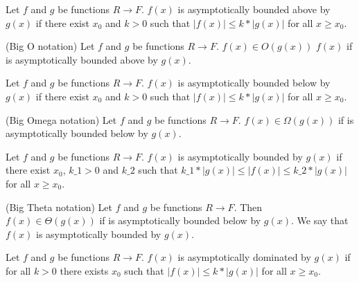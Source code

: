 \begin{definition}
\leanok
    Let $f$ and $g$ be functions $R \to F$. $f(x)$ is asymptotically bounded above by $g(x)$ if 
    there exist $x_0$ and $k > 0$ such that $|f(x)| \le k*|g(x)|$ for all $x \ge x_0$.
\end{definition}

\begin{definition}(Big O notation)
\leanok
    Let $f$ and $g$ be functions $R \to F$. $f(x) \in O(g(x))$ $f(x)$ if is asymptotically 
    bounded above by $g(x)$.
\end{definition}

\begin{definition}
\leanok
    Let $f$ and $g$ be functions $R \to F$. $f(x)$ is asymptotically bounded below by $g(x)$ if 
    there exist $x_0$ and $k > 0$ such that $|f(x)| \le k*|g(x)|$ for all $x \ge x_0$.
\end{definition}

\begin{definition}(Big Omega notation)
\leanok
    Let $f$ and $g$ be functions $R \to F$. $f(x) \in \Omega(g(x))$ if is asymptotically 
    bounded below by $g(x)$.
\end{definition}

\begin{definition}
\leanok
    Let $f$ and $g$ be functions $R \to F$. $f(x)$ is asymptotically bounded by $g(x)$ if 
    there exist $x_0$, $k\_1 > 0$ and $k\_2$ such that $k\_1*|g(x)| \le |f(x)| \le k\_2*|g(x)|$ 
    for all $x \ge x_0$.
\end{definition}

\begin{definition}(Big Theta notation)
\leanok
    Let $f$ and $g$ be functions $R \to F$. Then $f(x) \in \Theta(g(x))$ if is asymptotically 
    bounded below by $g(x)$. We say that $f(x)$ is asymptotically bounded by $g(x)$.
\end{definition}

\begin{definition}
\leanok
    Let $f$ and $g$ be functions $R \to F$. $f(x)$ is asymptotically dominated by $g(x)$ if 
    for all $k > 0$ there exists $x_0$ such that $|f(x)| \le k*|g(x)|$ for all $x \ge x_0$.
\end{definition}

